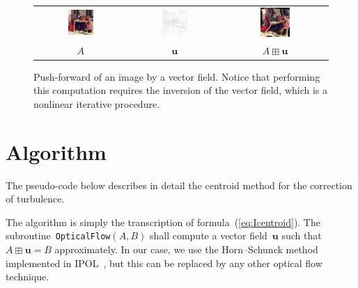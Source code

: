 \documentclass{ipol}
\def\u{\mathbf{u}}
\begin{document}
\begin{figure}[h]
	\begin{center}
		\begin{tabular}{ccc}
			\includegraphics[width=0.3\textwidth]{f/samarkand.png} &
			\includegraphics[width=0.3\textwidth]{f/deformation.png} &
			\includegraphics[width=0.3\textwidth]{f/deforkand.png} \\
			$A$ & $\u$ & $A\boxplus\u$ \\
		\end{tabular}
	\end{center}
	\caption{
	Push-forward of an image by a vector field.
	Notice that performing this computation requires the inversion of the vector
	field, which is a nonlinear iterative procedure.
	}
	\label{fig:pushforward}
\end{figure}

\section{Algorithm}

The pseudo-code below describes in detail the centroid method for the
correction of turbulence.

The algorithm is simply the transcription of formula~(\ref{eq:Icentroid}).
The subroutine~\texttt{OpticalFlow}$(A,B)$ shall compute a vector field~$\u$
such that~$A\boxplus\u=B$ approximately.  In our case, we use the
Horn--Schunck method~\cite{horn1981determining} implemented in
IPOL~\cite{HSipol}, but this can be replaced by any other optical flow
technique.
\end{document}
